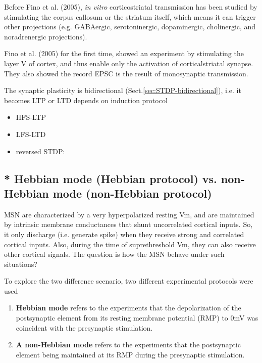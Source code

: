 Before Fino et al. (2005), {\it in vitro} corticostriatal transmission has been
studied by stimulating the corpus callosum or the striatum itself, which means
it can trigger other projections (e.g. GABAergic, serotoninergic, dopaminergic,
cholinergic, and noradrenergic projections).

Fino et al. (2005) for the first time, showed an experiment by stimulating the
layer V of cortex, and thus enable only the activation of corticalstriatal
synapse. They also showed the record EPSC is the result of monosynaptic
transmission. 

The synaptic plasticity is bidirectional (Sect.\ref{sec:STDP-bidirectional}),
i.e. it becomes LTP or LTD depends on induction protocol
\begin{itemize}
  \item HFS-LTP
  \item LFS-LTD
  \item reversed STDP:
\end{itemize}




\subsection{* Hebbian mode (Hebbian protocol) vs. non-Hebbian mode
(non-Hebbian protocol)}
\label{sec:Hebbian-mode}

MSN are characterized by a very hyperpolarized resting Vm, and are maintained by
intrinsic membrane conductances that shunt uncorrelated cortical inputs. So, it
only discharge (i.e. generate spike) when they receive strong and correlated
cortical inputs. Also, during the time of suprethreshold Vm, they can also
receive other cortical signals. The question is how the MSN behave under such
situations?

To explore the two difference scenario, two different experimental protocols
were used \citep{fino2005, fino2010}
\begin{enumerate}
  \item  {\bf Hebbian mode} refers to the experiments that the depolarization of the
postsynaptic element from its resting membrane potential (RMP) to 0mV was
coincident with the presynaptic stimulation.

  \item {\bf A non-Hebbian mode} refers to the experiments that the postsynaptic
element being maintained at its RMP during the presynaptic stimulation.

\end{enumerate}


